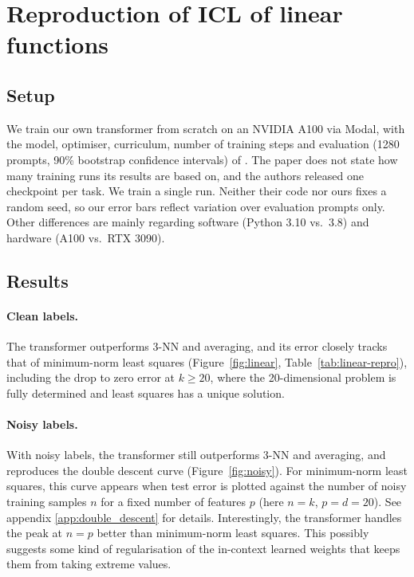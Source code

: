 \vspace{-0.5em}
\section{Reproduction of ICL of linear functions}
\vspace{-0.5em}
\subsection{Setup}
\vspace{-0.5em}
We train our own transformer from scratch on an NVIDIA A100 via Modal, with the model,
optimiser, curriculum, number of training steps and evaluation (1280 prompts, 90\%
bootstrap confidence intervals) of \cite{garg2022what}. The paper does not state how many
training runs its results are based on, and the authors released one checkpoint per task.
We train a single run. Neither their code nor ours fixes a random seed, so our error bars
reflect variation over evaluation prompts only. Other differences are mainly regarding software
(Python 3.10 vs.\ 3.8) and hardware (A100 vs.\ RTX 3090).

\vspace{-0.5em}
\subsection{Results}
\vspace{-0.5em}

\paragraph{Clean labels.}
The transformer outperforms 3-NN and averaging, and its error closely tracks that of
minimum-norm least squares (Figure~\ref{fig:linear}, Table~\ref{tab:linear-repro}),
including the drop to zero error at $k \geq 20$, where the 20-dimensional problem is
fully determined and least squares has a unique solution.

\vspace{-1em}
\paragraph{Noisy labels.}
With noisy labels, the transformer still outperforms 3-NN and averaging, and reproduces
the double descent curve (Figure~\ref{fig:noisy}). For minimum-norm least squares, this
curve appears when test error is plotted against the number of noisy training samples
$n$ for a fixed number of features $p$ (here $n = k$, $p = d = 20$). See appendix \ref{app:double_descent} for details. Interestingly, the transformer handles the peak at $n = p$
better than minimum-norm least squares. This possibly suggests some kind of
regularisation of the in-context learned weights that keeps them from taking extreme
values.
\vspace{-1em}

